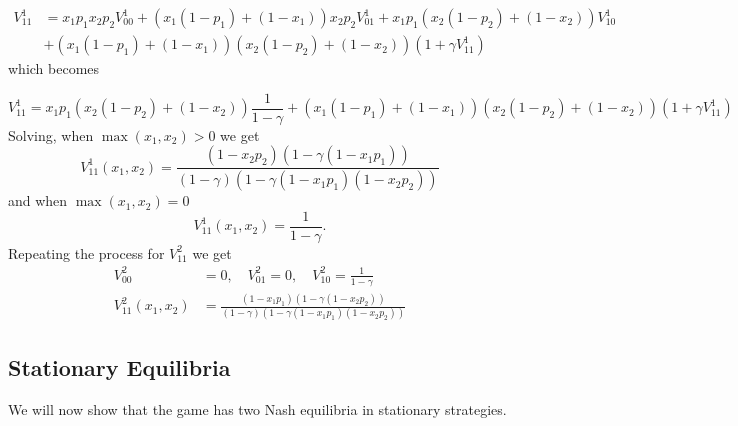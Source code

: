 \documentclass{article}%
\numberwithin{equation}{section}
\begin{document}
\begin{align*}
V_{11}^{1}  &  =x_{1}p_{1}x_{2}p_{2}V_{00}^{1}+\left(  x_{1}\left(
1-p_{1}\right)  +\left(  1-x_{1}\right)  \right)  x_{2}p_{2}V_{01}^{1}%
+x_{1}p_{1}\left(  x_{2}\left(  1-p_{2}\right)  +\left(  1-x_{2}\right)
\right)  V_{10}^{1}\\
&  +\left(  x_{1}\left(  1-p_{1}\right)  +\left(  1-x_{1}\right)  \right)
\left(  x_{2}\left(  1-p_{2}\right)  +\left(  1-x_{2}\right)  \right)  \left(
1+\gamma V_{11}^{1}\right)
\end{align*}
which becomes%

\[
V_{11}^{1}=x_{1}p_{1}\left(  x_{2}\left(  1-p_{2}\right)  +\left(
1-x_{2}\right)  \right)  \frac{1}{1-\gamma}+\left(  x_{1}\left(
1-p_{1}\right)  +\left(  1-x_{1}\right)  \right)  \left(  x_{2}\left(
1-p_{2}\right)  +\left(  1-x_{2}\right)  \right)  \left(  1+\gamma V_{11}%
^{1}\right)
\]
Solving, when $\max\left(  x_{1},x_{2}\right)  >0$ we get%
\[
V_{11}^{1}\left(  x_{1},x_{2}\right)  =\frac{\left(  1-x_{2}p_{2}\right)
\left(  1-\gamma\left(  1-x_{1}p_{1}\right)  \right)  }{\left(  1-\gamma
\right)  \left(  1-\gamma\left(  1-x_{1}p_{1}\right)  \left(  1-x_{2}%
p_{2}\right)  \right)  }%
\]
and when $\max\left(  x_{1},x_{2}\right)  =0$
\[
V_{11}^{1}\left(  x_{1},x_{2}\right)  =\frac{1}{1-\gamma}.
\]
Repeating the process for $V_{11}^{2}$ we get
\begin{align*}
V_{00}^{2}  &  =0,\quad V_{01}^{2}=0,\quad V_{10}^{2}=\frac{1}{1-\gamma}\\
V_{11}^{2}\left(  x_{1},x_{2}\right)   &  =\frac{\left(  1-x_{1}p_{1}\right)
\left(  1-\gamma\left(  1-x_{2}p_{2}\right)  \right)  }{\left(  1-\gamma
\right)  \left(  1-\gamma\left(  1-x_{1}p_{1}\right)  \left(  1-x_{2}%
p_{2}\right)  \right)  }%
\end{align*}


\subsection{Stationary Equilibria}

We will now show that the game has two Nash equilibria in stationary strategies.
\end{document}
